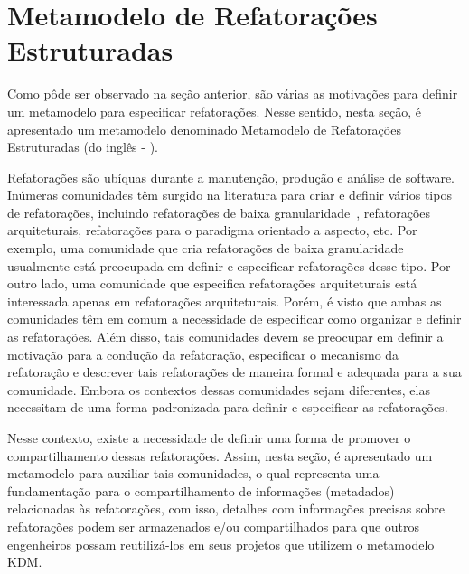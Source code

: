 
\section{Metamodelo de Refatorações Estruturadas} %
\label{sec:meta_modelo_de_refatora_es_estruturadas_srm_do_ingl_s_structured refactoring meta-model_}

Como pôde ser observado na seção anterior, são várias as motivações para definir um metamodelo para especificar refatorações. Nesse sentido, nesta seção, é apresentado um metamodelo denominado Metamodelo de Refatorações Estruturadas (do inglês - ).

Refatorações são ubíquas durante a manutenção, produção e análise de software. Inúmeras comunidades têm surgido na literatura para criar e definir vários tipos de refatorações, incluindo refatorações de baixa granularidade~\cite{Fowler1999, Demeyer1, Demeyer2}, refatorações arquiteturais, refatorações para o paradigma orientado a aspecto, etc. Por exemplo, uma comunidade que cria refatorações de baixa granularidade usualmente está preocupada em definir e especificar refatorações desse tipo. Por outro lado, uma comunidade que especifica refatorações arquiteturais está interessada apenas em refatorações arquiteturais. Porém, é visto que ambas as comunidades têm em comum a necessidade de especificar como organizar e definir as refatorações. Além disso, tais comunidades devem se preocupar em definir a motivação para a condução da refatoração, especificar o mecanismo da refatoração e descrever tais refatorações de maneira formal e adequada para a sua comunidade. Embora os contextos dessas comunidades sejam diferentes, elas necessitam de uma forma padronizada para definir e especificar as refatorações. 

Nesse contexto, existe a necessidade de definir uma forma de promover o compartilhamento dessas refatorações. Assim, nesta seção, é apresentado um metamodelo para auxiliar tais comunidades, o qual representa uma fundamentação para o compartilhamento de informações (metadados) relacionadas às refatorações, com isso, detalhes com informações precisas sobre refatorações podem ser armazenados e/ou compartilhados para que outros engenheiros possam reutilizá-los em seus projetos que utilizem o metamodelo KDM.


